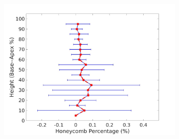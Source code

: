 \begin{figure}[H]
\begin{subfigure}{.4\linewidth}
  \includegraphics[width=\linewidth,trim={{.0\wd0} {.0\wd0} {.0\wd0} {.0\wd0}},clip]{QuantitativeAnalysis/Image/RightLungHoneycombDiseaseAgainstHeight.jpg}
  \caption{}
  \label{fig:DiseaseAgainstHeight-f}
\end{subfigure}
\begin{subfigure}{.4\linewidth}%

\end{subfigure}
\end{figure}
